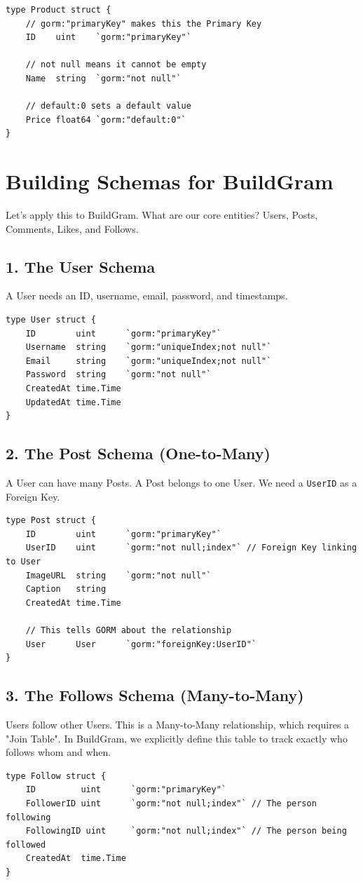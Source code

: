 \documentclass[11pt,a4paper]{article}
\begin{document}
\begin{lstlisting}
type Product struct {
    // gorm:"primaryKey" makes this the Primary Key
    ID    uint    `gorm:"primaryKey"` 
    
    // not null means it cannot be empty
    Name  string  `gorm:"not null"`   
    
    // default:0 sets a default value
    Price float64 `gorm:"default:0"`  
}
\end{lstlisting}

\section{Building Schemas for BuildGram}
Let's apply this to BuildGram. What are our core entities? Users, Posts, Comments, Likes, and Follows.

\subsection{1. The User Schema}
A User needs an ID, username, email, password, and timestamps.
\begin{lstlisting}
type User struct {
    ID        uint      `gorm:"primaryKey"`
    Username  string    `gorm:"uniqueIndex;not null"`
    Email     string    `gorm:"uniqueIndex;not null"`
    Password  string    `gorm:"not null"`
    CreatedAt time.Time
    UpdatedAt time.Time
}
\end{lstlisting}

\subsection{2. The Post Schema (One-to-Many)}
A User can have many Posts. A Post belongs to one User. We need a \texttt{UserID} as a Foreign Key.
\begin{lstlisting}
type Post struct {
    ID        uint      `gorm:"primaryKey"`
    UserID    uint      `gorm:"not null;index"` // Foreign Key linking to User
    ImageURL  string    `gorm:"not null"`
    Caption   string
    CreatedAt time.Time
    
    // This tells GORM about the relationship
    User      User      `gorm:"foreignKey:UserID"`
}
\end{lstlisting}

\subsection{3. The Follows Schema (Many-to-Many)}
Users follow other Users. This is a Many-to-Many relationship, which requires a "Join Table". In BuildGram, we explicitly define this table to track exactly who follows whom and when.
\begin{lstlisting}
type Follow struct {
    ID         uint      `gorm:"primaryKey"`
    FollowerID uint      `gorm:"not null;index"` // The person following
    FollowingID uint     `gorm:"not null;index"` // The person being followed
    CreatedAt  time.Time
}
\end{lstlisting}
\end{document}
